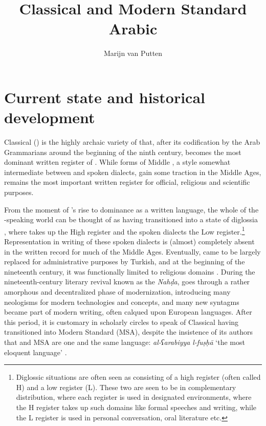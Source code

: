 \documentclass[output=paper]{langsci/langscibook}
\author{Marijn van Putten\affiliation{University of Leiden}}
\title{Classical and Modern Standard Arabic}
\begin{document}
\maketitle 
\let\textstyleannotationreference\relax{}
\section{Current state and historical development}

Classical  () is the highly archaic variety of  that, after its codification by the Arab Grammarians around the beginning of the ninth century, becomes the most dominant written {register} of . While forms of Middle , a style somewhat intermediate between  and spoken dialects, gain some traction in the Middle Ages,  remains the most important written {register} for official, religious and scientific purposes. 

From the moment of ’s rise to dominance as a written language, the whole of the -speaking world can be thought of as having transitioned into a state of {diglossia} \citep{Ferguson1959,Ferguson1996}, where  takes up the High {register} and the spoken dialects the Low {register}.\footnote{Diglossic situations are often seen as consisting of a high {register} (often called H) and a low {register} (L). These two are seen to be in complementary distribution, where each {register} is used in designated environments, where the H {register} takes up such domains like formal speeches and writing, while the L {register} is used in personal conversation, oral literature etc.} Representation in writing of these spoken dialects is (almost) completely absent in the written record for much of the Middle Ages. Eventually,  came to be largely replaced for administrative purposes by  {Turkish}, and at the beginning of the nineteenth century, it was functionally limited to religious domains \citep[836]{Glaß2011}. During the nineteenth-century  literary revival known as the \textit{Nahḍa},  goes through a rather amorphous and decentralized phase of modernization, introducing many neologisms for modern technologies and concepts, and many new syntagms became part of modern writing, often calqued upon European languages. After this period, it is customary in scholarly circles to speak of Classical  having transitioned into Modern Standard  (MSA), despite the insistence of its authors that  and MSA are one and the same language: \textit{al-ʕarabiyya} \textit{l-fuṣḥā} ‘the most eloquent  language’ \citep[845]{Ryding2011}.
\end{document}
